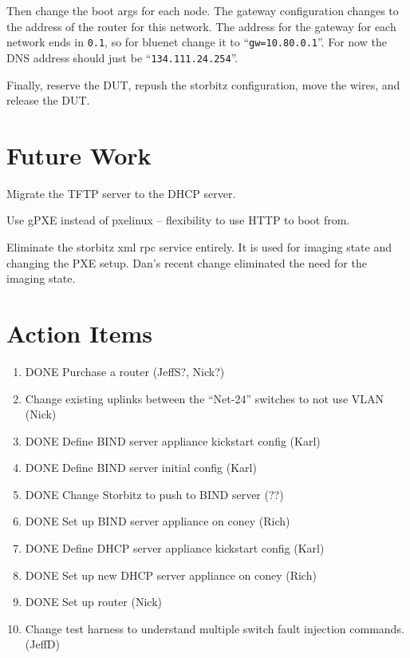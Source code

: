 \documentclass[twoside]{article}
\begin{document}
Then change the boot args for each node.
The gateway configuration changes to the address of the
router for this network.
The address for the gateway for each network ends in \verb+0.1+,
so for bluenet change it to ``\verb+gw=10.80.0.1+''.
For now the DNS address should just be ``\verb+134.111.24.254+''.

Finally, reserve the DUT, repush the storbitz configuration,
move the wires, and release the DUT.

\section{Future Work}

Migrate the TFTP server to the DHCP server.

Use gPXE instead of pxelinux -- flexibility to use HTTP to boot from.

Eliminate the storbitz xml rpc service entirely.
It is used for imaging state and changing the PXE setup.
Dan's recent change eliminated the need for the imaging state.

\section{Action Items}

\begin{enumerate}
  \setlength{\itemsep}{1pt}
  \setlength{\parskip}{0pt}
  \setlength{\parsep}{0pt}
\item DONE Purchase a router (JeffS?, Nick?)
\item Change existing uplinks between the ``Net-24'' switches to not use VLAN (Nick)
\item DONE Define BIND server appliance kickstart config (Karl)
\item DONE Define BIND server initial config (Karl)
\item DONE Change Storbitz to push to BIND server (??)
\item DONE Set up BIND server appliance on coney (Rich)
\item DONE Define DHCP server appliance kickstart config (Karl)
\item DONE Set up new DHCP server appliance on coney (Rich)
\item DONE Set up router (Nick)
\item Change test harness to understand multiple switch fault injection commands. (JeffD)
\end{enumerate}
\end{document}
